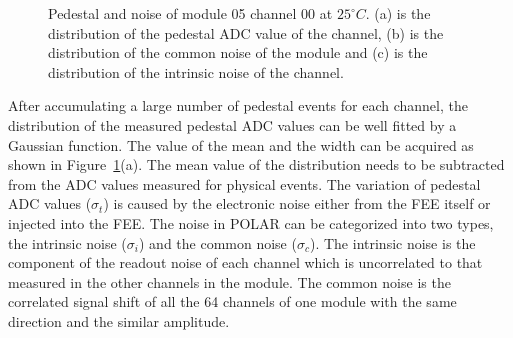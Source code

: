 \documentclass[preprint,sort&compress,12pt]{elsarticle}
\begin{document}
\begin{figure}[!ht]
\centering
{}
\caption{Pedestal and noise of module 05 channel 00 at $25^\circ C$. (a) is the distribution of the pedestal ADC value of the channel, (b) is the distribution of the common noise of the module and (c) is the distribution of the intrinsic noise of the channel.}\label{fig:pedestal}
\end{figure}

After accumulating a large number of pedestal events for each channel, the distribution of the measured pedestal ADC values can be well fitted by a Gaussian function. The value of the mean and the width can be acquired as shown in Figure~\ref{fig:pedestal}(a). The mean value of the distribution needs to be subtracted from the ADC values measured for physical events. The variation of pedestal ADC values ($\sigma_t$) is caused by the electronic noise either from the FEE itself or injected into the FEE. The noise in POLAR can be categorized into two types, the intrinsic noise ($\sigma_i$) and the common noise ($\sigma_c$). The intrinsic noise is the component of the readout noise of each channel which is uncorrelated to that measured in the other channels in the module. The common noise is the correlated signal shift of all the 64 channels of one module with the same direction and the similar amplitude.
\end{document}
